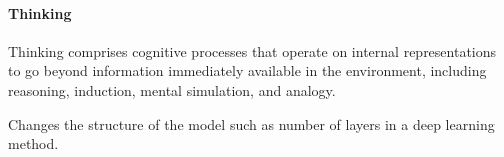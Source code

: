 \documentclass[a4paper]{standalone}
\title{}
\begin{document}
   \maketitle
            \paragraph{Thinking}

               \cite{markman-2001-thinking}
               Thinking comprises cognitive processes that operate on internal representations to go beyond information immediately available in the environment, including reasoning, induction, mental simulation, and analogy.

               Changes the structure of the model such as number of layers in a deep learning method.
\end{document}
